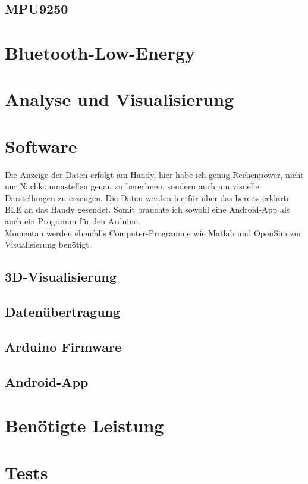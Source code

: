 \documentclass[11pt, titlepage, parskip=half-]{scrreprt}
\begin{document}
\section{MPU9250}


\chapter{Bluetooth-Low-Energy}


\chapter{Analyse und Visualisierung}


\chapter{Software}
Die Anzeige der Daten erfolgt am Handy, hier habe ich genug Rechenpower,
nicht nur Nachkommastellen genau zu berechnen, sondern auch um 
visuelle Darstellungen zu erzeugen. Die Daten werden hierfür über das bereits
erklärte BLE an das Handy gesendet.
Somit brauchte ich sowohl eine Android-App als auch ein Programm für den Arduino. \\ 
Momentan werden ebenfalls Computer-Programme wie Matlab und OpenSim zur Visualisierung benötigt.
\section{3D-Visualisierung}

\section{Datenübertragung}

\section{Arduino Firmware}

\section{Android-App}

\chapter{Benötigte Leistung}


\chapter{Tests}

%
%
\end{document}
